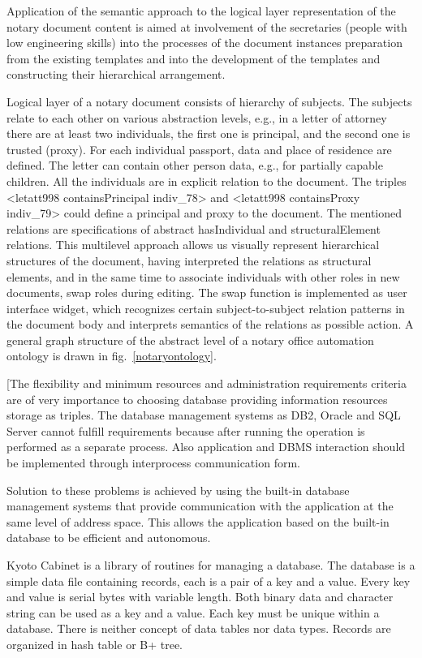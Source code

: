 \documentclass[utf8]{../IncArticle}
\begin{document}
Application of the semantic approach to the logical layer representation of the notary document content is aimed at involvement of the secretaries (people with low engineering skills) into the processes of the document instances preparation from the existing templates and into the development of the templates and constructing their hierarchical arrangement.

Logical layer of a notary document consists of hierarchy of subjects.  The subjects relate to each other on various abstraction levels, e.g., in a letter of attorney there are at least two individuals, the first one is principal, and the second one is trusted (proxy).  For each individual passport, data and place of residence are defined.  The letter can contain other person data, e.g., for partially capable children.  All the individuals are in explicit relation to the document.  The triples <letatt998 containsPrincipal indiv\_78> and <letatt998 containsProxy indiv\_79> could define a principal and proxy to the document.  The mentioned relations are specifications of abstract hasIndividual and structuralElement relations.  This multilevel approach allows us visually represent hierarchical structures of the document, having interpreted the relations as structural elements, and in the same time to associate individuals with other roles in new documents, swap roles during editing.  The swap function is implemented as user interface widget, which recognizes certain subject-to-subject relation patterns in the document body and interprets semantics of the relations as possible action.  A general graph structure of the abstract level of a notary office automation ontology is drawn in fig.~\ref{notaryontology}.

[The flexibility and minimum resources and administration requirements criteria are of very importance to choosing database providing information resources storage as triples.  The database management systems as DB2, Oracle and SQL Server cannot fulfill requirements because after running the operation is performed as a separate process.  Also application and DBMS interaction should be implemented through interprocess communication form.

Solution to these problems is achieved by using the built-in database management systems that provide communication with the application at the same level of address space.  This allows the application based on the built-in database to be efficient and autonomous.

Kyoto Cabinet is a library of routines for managing a database.  The database is a simple data file containing records, each is a pair of a key and a value.  Every key and value is serial bytes with variable length.  Both binary data and character string can be used as a key and a value.  Each key must be unique within a database.  There is neither concept of data tables nor data types.  Records are organized in hash table or B+ tree.  \cite{b1}
\end{document}
